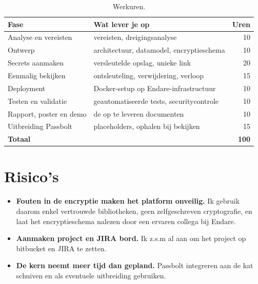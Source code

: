 \begin{table}[htbp]
  \centering
  \small
  \begin{tabular}{@{}p{}p{}r@{}}
    \toprule
    \textbf{Fase} & \textbf{Wat lever je op} & \textbf{Uren} \\
    \midrule
    Analyse en vereisten         & vereisten, dreigingsanalyse                  & 10  \\
    Ontwerp                      & architectuur, datamodel, encryptieschema     & 10  \\
    Secrets aanmaken             & versleutelde opslag, unieke link             & 20  \\
    Eenmalig bekijken            & ontsleuteling, verwijdering, verloop         & 15  \\
    Deployment                   & Docker-setup op Endare-infrastructuur        & 10  \\
    Testen en validatie          & geautomatiseerde tests, securitycontrole     & 10  \\
    Rapport, poster en demo      & de op te leveren documenten                  & 10  \\
    Uitbreiding Passbolt         & placeholders, ophalen bij bekijken           & 15  \\
    \midrule
    \textbf{Totaal}              &                                              & \textbf{100} \\
    \bottomrule
  \end{tabular}
  \caption[Planning en werkbelasting]{\label{tab:vst-planning}%
    Werkuren.}
\end{table}


\section{Risico's}%
\label{vst:risicos}

\begin{itemize}
  \item \textbf{Fouten in de encryptie maken het platform onveilig.} Ik
        gebruik daarom enkel vertrouwde bibliotheken, geen zelfgeschreven
        cryptografie, en laat het encryptieschema nalezen door een ervaren
        collega bij Endare.
  \item \textbf{Aanmaken project en JIRA bord.} Ik z.s.m al aan om het project op bitbucket en JIRA te zetten.
  \item \textbf{De kern neemt meer tijd dan gepland.} Passbolt integreren aan de kat schuiven en als eventuele uitbreiding gebruiken.
\end{itemize}